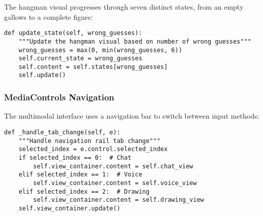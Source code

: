 The hangman visual progresses through seven distinct states, from an empty gallows to a complete figure:

\begin{lstlisting}[style=pystyle, caption={Hangman Visual State Management}]
def update_state(self, wrong_guesses):
    """Update the hangman visual based on number of wrong guesses"""
    wrong_guesses = max(0, min(wrong_guesses, 6))
    self.current_state = wrong_guesses
    self.content = self.states[wrong_guesses]
    self.update()
\end{lstlisting}

\subsubsection*{MediaControls Navigation}

The multimodal interface uses a navigation bar to switch between input methods:

\begin{lstlisting}[style=pystyle, caption={Multimodal Interface Navigation}]
def _handle_tab_change(self, e):
    """Handle navigation rail tab change"""
    selected_index = e.control.selected_index
    if selected_index == 0:  # Chat
        self.view_container.content = self.chat_view
    elif selected_index == 1:  # Voice
        self.view_container.content = self.voice_view  
    elif selected_index == 2:  # Drawing
        self.view_container.content = self.drawing_view
    self.view_container.update()
\end{lstlisting}
